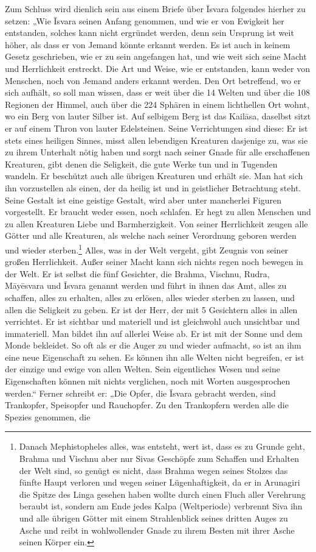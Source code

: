 \documentclass{article}
\begin{document}
Zum Schluss wird dienlich sein aus einem Briefe über \={I}svara folgendes hierher zu setzen: „Wie \={I}svara seinen Anfang genommen, und wie er von Ewigkeit her entstanden, solches kann nicht ergründet werden, denn sein Ursprung ist weit höher, als dass er von Jemand könnte erkannt werden. Es ist auch in keinem Gesetz geschrieben, wie er zu sein angefangen hat, und wie weit sich seine Macht und Herrlichkeit erstreckt. Die Art und Weise, wie er entstanden, kann weder von Menschen, noch von Jemand anders erkannt werden. Den Ort betreffend, wo er sich aufhält, so soll man wissen, dass er weit über die 14 Welten und über die 108 Regionen der Himmel, auch über die 224 Sphären in einem lichthellen Ort wohnt, wo ein Berg von lauter Silber ist. Auf selbigem Berg ist das Kail\={a}sa, daselbst sitzt er auf einem Thron von lauter Edelsteinen. Seine Verrichtungen sind diese: Er ist stets eines heiligen Sinnes, misst allen lebendigen Kreaturen dasjenige zu, was sie zu ihrem Unterhalt nötig haben und sorgt nach seiner Gnade für alle erschaffenen Kreaturen, gibt denen die Seligkeit, die gute Werke tun und in Tugenden wandeln. Er beschützt auch alle übrigen Kreaturen und erhält sie. Man hat sich ihn vorzustellen als einen, der da heilig ist und in geistlicher Betrachtung steht. Seine Gestalt ist eine geistige Gestalt, wird aber unter mancherlei Figuren vorgestellt. Er braucht weder essen, noch schlafen. Er hegt zu allen Menschen und zu allen Kreaturen Liebe und Barmherzigkeit. Von seiner Herrlichkeit zeugen alle Götter und alle Kreaturen, als welche nach seiner Verordnung geboren werden und wieder sterben.\footnote{Danach Mephistopheles alles, was entsteht, wert ist, dass es zu Grunde geht, Brahma und Vischnu aber nur Sivas Geschöpfe zum Schaffen und Erhalten der Welt sind, so genügt es nicht, dass Brahma wegen seines Stolzes das fünfte Haupt verloren und wegen seiner Lügenhaftigkeit, da er in Arunagiri die Spitze des Linga gesehen haben wollte durch einen Fluch aller Verehrung beraubt ist, sondern am Ende jedes Kalpa (Weltperiode) verbrennt Siva ihn und alle übrigen Götter mit einem Strahlenblick seines dritten Auges zu Asche und reibt in wohlwollender Gnade zu ihrem Besten mit ihrer Asche seinen Körper ein.} Alles, was in der Welt vergeht, gibt Zeugnis von seiner großen Herrlichkeit. Außer seiner Macht kann sich nichts regen noch bewegen in der Welt. Er ist selbst die fünf Gesichter, die Brahma, Vischnu, Rudra, M\={a}y\={e}svara und \={I}svara genannt werden und führt in ihnen das Amt, alles zu schaffen, alles zu erhalten, alles zu erlösen, alles wieder sterben zu lassen, und allen die Seligkeit zu geben. Er ist der Herr, der mit 5 Gesichtern alles in allen verrichtet. Er ist sichtbar und materiell und ist gleichwohl auch unsichtbar und immateriell. Man bildet ihn auf allerlei Weise ab. Er ist mit der Sonne und dem Monde bekleidet. So oft als er die Auger zu und wieder aufmacht, so ist an ihm eine neue Eigenschaft zu sehen. Es können ihn alle Welten nicht begreifen, er ist der einzige und ewige von allen Welten. Sein eigentliches Wesen und seine Eigenschaften können mit nichts verglichen, noch mit Worten ausgesprochen werden.“ Ferner schreibt er: „Die Opfer, die \={I}svara gebracht werden, sind Trankopfer, Speisopfer und Rauchopfer. Zu den Trankopfern werden alle die Spezies genommen, die 
\end{document}
